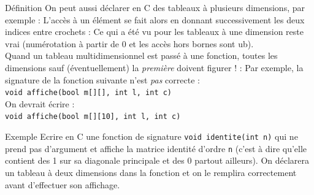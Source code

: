\documentclass[10pt]{beamer}
\begin{document}
\begin{frame}[fragile]{\Ctitle}{\stitle}
	\begin{block}{Définition}
		On peut aussi déclarer en C des tableaux à plusieurs dimensions, par exemple :
		L'accès à un élément se fait alors en donnant successivement les deux indices entre crochets :
		Ce qui a été vu pour les tableaux à une dimension reste vrai (numérotation à partir de 0 et les accès hors bornes sont {\sc ub}).\\ \medskip
		\textcolor{BrickRed}{\small \danger } Quand un tableau multidimensionnel est passé à une fonction, toutes les dimensions sauf (éventuellement) la \textit{première} doivent figurer ! :
		Par exemple, la signature de la fonction suivante n'est \textit{pas} correcte : \\
		\texttt{void affiche(bool m[][], int l, int c)} \\
		On devrait écrire : \\
		\texttt{void affiche(bool m[][10], int l, int c)}
	\end{block}
\end{frame}

\begin{frame}[fragile]{\Ctitle}{\stitle}
	\begin{exampleblock}{Exemple}
		Ecrire en C une fonction de signature \texttt{void identite(int n)} qui ne prend pas d'argument et affiche la matrice identité d'ordre {\tt n} (c'est à dire qu'elle contient des 1 sur sa diagonale principale et des 0 partout ailleurs). On déclarera un tableau à deux dimensions dans la fonction et on le remplira correctement avant d'effectuer son affichage.
	\end{exampleblock}
\end{frame}
\end{document}
